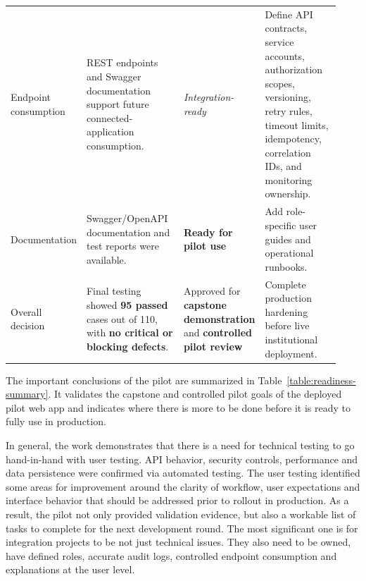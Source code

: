 \begin{longtable}{>{\raggedright\arraybackslash}p{0.20\linewidth}
>{\raggedright\arraybackslash}p{0.31\linewidth}
>{\raggedright\arraybackslash}p{0.17\linewidth}
>{\raggedright\arraybackslash}p{0.25\linewidth}}
Endpoint consumption & REST endpoints and Swagger documentation support future connected-application consumption. & \textit{Integration-ready} & Define API contracts, service accounts, authorization scopes, versioning, retry rules, timeout limits, idempotency, correlation IDs, and monitoring ownership. \\
Documentation & Swagger/OpenAPI documentation and test reports were available. & \textbf{Ready for pilot use} & Add role-specific user guides and operational runbooks. \\
Overall decision & Final testing showed \textbf{95 passed} cases out of 110, with \textbf{no critical or blocking defects}. & Approved for \textbf{capstone demonstration} and \textbf{controlled pilot review} & Complete production hardening before live institutional deployment. \\
\end{longtable}

The important conclusions of the pilot are summarized in Table~\ref{table:readiness-summary}. It validates the capstone and controlled pilot goals of the deployed pilot web app and indicates where there is more to be done before it is ready to fully use in production.

In general, the work demonstrates that there is a need for technical testing to go hand-in-hand with user testing. API behavior, security controls, performance and data persistence were confirmed via automated testing. The user testing identified some areas for improvement around the clarity of workflow, user expectations and interface behavior that should be addressed prior to rollout in production. As a result, the pilot not only provided validation evidence, but also a workable list of tasks to complete for the next development round. The most significant one is for integration projects to be not just technical issues. They also need to be owned, have defined roles, accurate audit logs, controlled endpoint consumption and explanations at the user level.